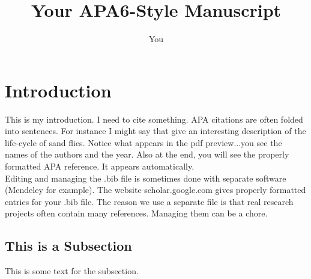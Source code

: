 \documentclass[letterpaper,man,natbib]{apa6}  %
\title{Your APA6-Style Manuscript}
\author{You}
\affiliation{Somewhere}
\begin{document}
\maketitle

\section{Introduction}
This is my introduction.  I need to cite something. APA citations are often folded into sentences. For instance I might say that \cite{gossage2003two} give an interesting description of the life-cycle of sand flies.  Notice what appears in the pdf preview...you see the names of the authors and the year.  Also at the end, you will see the properly formatted APA reference.  It appears automatically.\\

Editing and managing the .bib file is sometimes done with separate software (Mendeley for example).  The website scholar.google.com gives properly formatted entries for your .bib file.  The reason we use a separate file is that real research projects often contain many references.  Managing them can be a chore.  


\subsection{This is a Subsection}
This is some text for the subsection.



\end{document}
